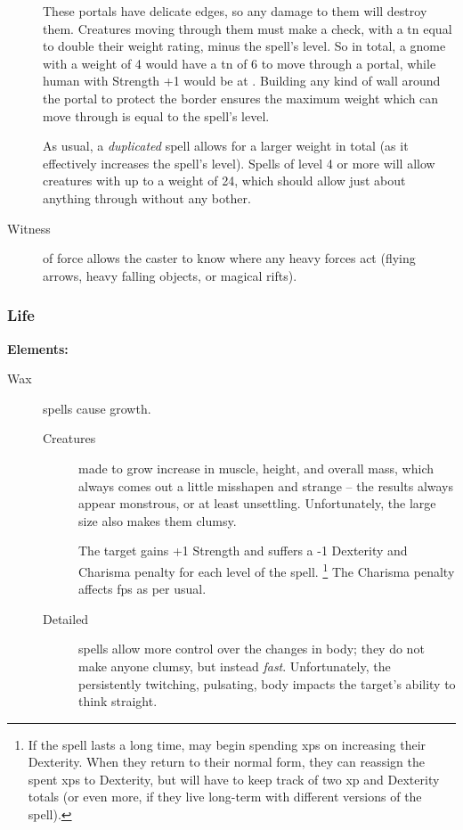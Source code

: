 \begin{multicols}{2}
\begin{description}
  These portals have delicate edges, so any damage to them will destroy them.
  Creatures moving through them must make a  check, with a \gls{tn} equal to double their \gls{weight} rating, minus the spell's level.
  So in total, a gnome with a \gls{weight} of 4 would have a \gls{tn} of 6 to move through a portal, while human with Strength +1 would be at \tn[12].
  Building any kind of wall around the portal to protect the border ensures the maximum \gls{weight} which can move through is equal to the spell's level.

  As usual, a \textit{duplicated} spell allows for a larger \gls{weight} in total (as it effectively increases the spell's level).
  Spells of level 4 or more will allow creatures with up to a \gls{weight} of 24, which should allow just about anything through without any bother.
  \item[Witness]
  of force allows the caster to know where any heavy forces act (flying arrows, heavy falling objects, or magical rifts).
\end{description}

\subsubsection{Life}

\textbf{Elements:}

\begin{description}
  \item[Wax]
  spells cause growth.
    \begin{description}
      \item[Creatures]
        made to grow increase in muscle, height, and overall mass, which always comes out a little misshapen and strange -- the results always appear monstrous, or at least unsettling.
        Unfortunately, the large size also makes them clumsy.

        The target gains +1 Strength and suffers a -1 Dexterity and Charisma penalty for each level of the spell.%
        \footnote{If the spell lasts a long time,  may begin spending \glspl{xp} on increasing their Dexterity. When they return to their normal form, they can reassign the spent \glspl{xp} to Dexterity, but will have to keep track of two \gls{xp} and Dexterity totals (or even more, if they live long-term with different versions of the spell).}
        The Charisma penalty affects \glspl{fp} as per usual.
      \item[Detailed]
        spells allow more control over the changes in body; they do not make anyone clumsy, but instead \emph{fast}.
        Unfortunately, the persistently twitching, pulsating, body impacts the target's ability to think straight.


\end{description}
\end{description}
\end{multicols}
